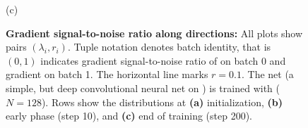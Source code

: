 \begin{figure}[!b]
  \vspace{-2\baselineskip}

  \begin{flushleft}
    \vspace{1ex}
    (c)
  \end{flushleft}
  \vspace{-2\baselineskip}

  \hfill
  \begin{minipage}[t]{0.325\linewidth}
    \centering
    
  \end{minipage}
  \begin{minipage}[t]{0.325\linewidth}
    \centering
    
  \end{minipage}
  \begin{minipage}[t]{0.325\linewidth}
    \centering
    
  \end{minipage}
  \hfill

  \vspace{-1\baselineskip}

  \caption{\textbf{Gradient signal-to-noise ratio along \ggn directions:} All
    plots show pairs $(\lambda_i, r_i)$. Tuple notation denotes batch identity,
    that is $(0,1)$ indicates gradient signal-to-noise ratio of \ggn on batch 0
    and gradient on batch 1. The horizontal line marks $r=0.1$. The net (a
    simple, but deep convolutional neural net on \mnist) is trained with \sgd
    ($N=128$). Rows show the distributions at \textbf{(a)} initialization,
    \textbf{(b)} early phase (step 10), and \textbf{(c)} end of training (step
    200).}
  \label{fig:gradient-signal-to-noise-ratio}
\end{figure}

